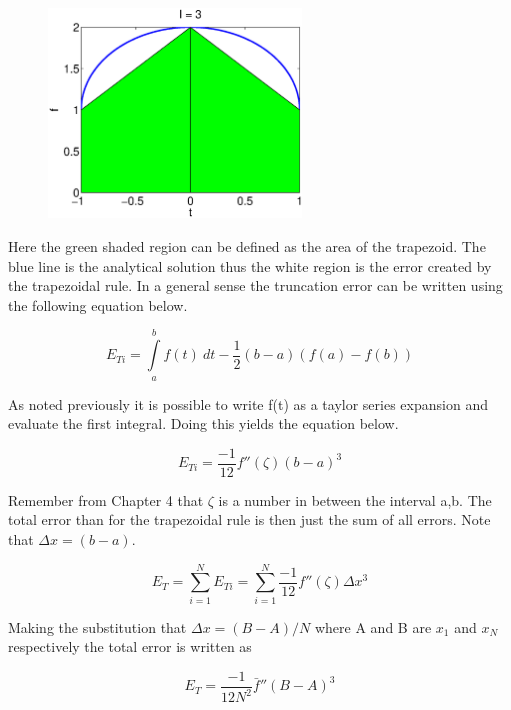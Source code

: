 \begin{enumerate}
  \begin{figure}[htb]
    \begin{center}
      \includegraphics[height=0.45\textwidth,width=0.6\textwidth]{Graphics/Truncation_Error}
    \end{center}
  \end{figure}
  
  Here the green shaded region can be defined as the area of the
  trapezoid. The blue line is the analytical solution thus the white
  region is the error created by the trapezoidal rule. In a general
  sense the truncation error can be written using the following
  equation below.
  
  \begin{equation}
    E_{Ti} = \int\limits_{a}^{b}f(t)~dt - \frac{1}2(b-a)(f(a)-f(b))
  \end{equation}

  As noted previously it is possible to write f(t) as a taylor series
  expansion and evaluate the first integral. Doing this yields the
  equation below.

  \begin{equation}
    E_{Ti} = \frac{-1}{12} f''(\zeta)(b-a)^3
  \end{equation}

  Remember from Chapter 4 that $\zeta$ is a number in
  between the interval a,b. The total error than for the trapezoidal
  rule is then just the sum of all errors. Note that $\Delta x = (b-a)$.

  \begin{equation}
    E_T = \sum\limits_{i=1}^N E_{Ti} = \sum\limits_{i=1}^N
    \frac{-1}{12} f''(\zeta)\Delta x^3
  \end{equation}

  Making the substitution that $\Delta x = (B-A)/N$ where A and B are
  $x_1$ and $x_N$ respectively the total error is written as

  \begin{equation}
    E_T = \frac{-1}{12 N^2} \bar{f}''(B-A)^3
  \end{equation}


\end{enumerate}
